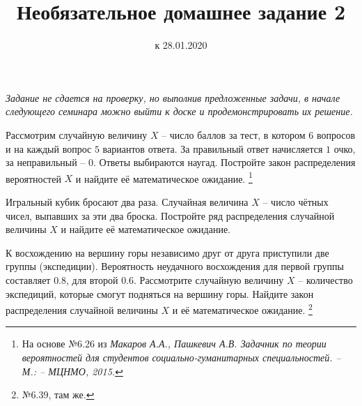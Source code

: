 \documentclass[a4paper, 12pt]{article}
\title{Необязательное домашнее задание 2}
\date{к 28.01.2020}
\begin{document}
\noindent\textit{Задание не сдается на проверку, но выполнив предложенные задачи, в начале 
следующего семинара можно выйти к доске и продемонстрировать их решение.}


\begin{problem}
Рассмотрим случайную величину $X$ – число баллов за тест, в котором $6$ вопросов 
и на каждый вопрос $5$ вариантов ответа. За правильный ответ начисляется $1$ очко, 
за неправильный – $0$. Ответы выбираются наугад. 
Постройте закон распределения вероятностей $X$ и 
найдите её математическое ожидание. 
\footnote{На основе №6.26 из \textit{Макаров А.А., Пашкевич А.В. Задачник по теории вероятностей для 
студентов социально-гуманитарных специальностей. -- М.: -- МЦНМО, 2015.}}
\end{problem}

\begin{problem}
Игральный кубик бросают два раза. Случайная величина $X$ – число чётных 
чисел, выпавших за эти два броска. Постройте ряд распределения случайной величины
$X$ и найдите её математическое ожидание.
\end{problem}

\begin{problem}
К восхождению на вершину горы независимо друг от друга 
приступили две группы (экспедиции). Вероятность неудачного
восхождения для первой группы составляет $0.8$, для второй
$0.6$. Рассмотрите случайную величину $X$ – количество экспедиций, 
которые смогут подняться на вершину горы. Найдите закон распределения 
случайной величины $X$ и её математическое ожидание.
\footnote{№6.39, там же.}
\end{problem}
\end{document}

